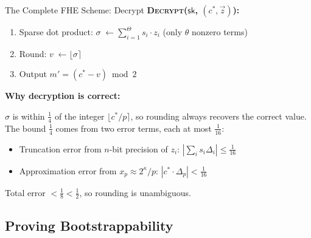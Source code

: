 \documentclass[10pt]{beamer}
\begin{document}
\begin{frame}{The Complete FHE Scheme: Decrypt}
    \textbf{\textsc{Decrypt}($\mathsf{sk}$,\; $(c^*, \vec{z})$):}
    \begin{enumerate}
        \item Sparse dot product:
              $\sigma \;\leftarrow \displaystyle\sum_{i=1}^\Theta s_i \cdot z_i$
              \hfill{\small(only $\theta$ nonzero terms)}
        \item Round: $v \;\leftarrow \lfloor \sigma \rceil$
        \item Output $m' = (c^* - v) \bmod 2$
    \end{enumerate}

    \vspace{0.4cm}
    \textbf{Why decryption is correct:}

    $\sigma$ is within $\tfrac{1}{4}$ of the integer $\lfloor c^*/p \rceil$,
    so rounding always recovers the correct value. The bound $\tfrac{1}{4}$
    comes from two error terms, each at most $\tfrac{1}{16}$:
    \begin{itemize}
        \item Truncation error from $n$-bit precision of $z_i$:
              $|\sum_i s_i \Delta_i| \leq \tfrac{1}{16}$
        \item Approximation error from $x_p \approx 2^\kappa/p$:
              $|c^* \cdot \Delta_p| < \tfrac{1}{16}$
    \end{itemize}

    \vspace{0.2cm}
    Total error $< \tfrac{1}{8} < \tfrac{1}{2}$, so rounding is unambiguous.
\end{frame}

\subsection{Proving Bootstrappability}
\end{document}
